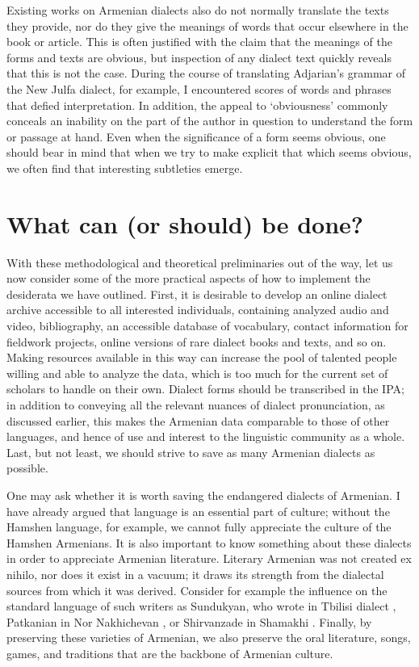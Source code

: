 \documentclass[output=paper]{langscibook}
\begin{document}
Existing works on Armenian dialects also do not normally translate the texts they provide, nor do they   give the meanings of words that occur elsewhere in the book or article. This is often justified with the claim that the meanings of the forms and texts are obvious, but inspection of any dialect text quickly reveals that this is not the case. During the course of translating Adjarian's grammar of the New Julfa dialect, for example, I encountered scores of words and phrases that defied interpretation. In addition, the appeal to `obviousness' commonly conceals an inability on the part of the author in question to understand the form or passage at hand. Even when the significance of a form seems obvious, one should bear in mind that when we try to make explicit that which seems obvious, we often find that interesting subtleties emerge.

\section{What can (or should) be done?}\label{sec:vaux:what}

With these methodological and theoretical preliminaries out of the way, let us now consider some of the more practical aspects of how to implement the desiderata we have outlined. First, it is desirable to develop an online dialect archive accessible to all interested individuals, containing analyzed audio and video, bibliography, an accessible database of vocabulary, contact information for fieldwork projects, online versions of rare dialect books and texts, and so on.  Making resources available in this way can increase the pool of talented people willing and able to analyze the data, which is too much for the current set of scholars to handle on their own. Dialect forms should be transcribed in the IPA; in addition to conveying all the relevant nuances of dialect pronunciation, as discussed earlier, this makes the Armenian data comparable to those of other languages, and hence of use and interest to the linguistic community as a whole. Last, but not least, we should strive to save as many Armenian dialects as possible.

One may ask whether it is worth saving the endangered dialects of Armenian. I have already argued that language is an essential part of culture; without the Hamshen language, for example, we cannot fully appreciate the culture of the Hamshen Armenians. It is also important to know something about these dialects in order to appreciate Armenian literature. Literary Armenian was not created ex nihilo, nor does it exist in a vacuum; it draws its strength from the dialectal sources from which it was derived. Consider for example the influence on the standard language of such writers as Sundukyan, who wrote in Tbilisi dialect \citep{Sundukyan-1951-CompleteCollection}, Patkanian  in Nor Nakhichevan   \citep{Patkanian-1875-RussianDialects}, or Shirvanzade in Shamakhi  \citep{Shirvanzade-1958-Erker}. Finally, by preserving these varieties of Armenian, we also preserve the oral literature, songs, games, and traditions that are the backbone of Armenian culture.
\end{document}
